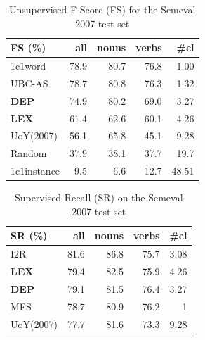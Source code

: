  

\begin{table}[!htb]
\centering

\begin{tabular}{@{}lrrrr@{}}
\toprule
\textbf{FS (\%)} & \textbf{all} & \textbf{nouns} & \textbf{verbs} & \textbf{\#cl} \\ \midrule
1c1word          & 78.9         & 80.7           & 76.8           & 1.00             \\
UBC-AS           & 78.7         & 80.8           & 76.3           & 1.32          \\
\textbf{DEP}     & 74.9         & 80.2           & 69.0           & 3.27          \\
\textbf{LEX}     & 61.4         & 62.6           & 60.1           & 4.26         \\
UoY(2007)        & 56.1         & 65.8           & 45.1           & 9.28          \\
Random           & 37.9         & 38.1           & 37.7           & 19.7             \\
1c1instance & 	9.5         & 6.6           & 12.7           & 48.51             \\ \bottomrule
\end{tabular}
\caption{Unsupervised F-Score (FS) for the Semeval 2007 test set}
\label{tab:sem2007_unsup_FS}
\end{table}
 

\begin{table}[!htb]
\centering

\begin{tabular}{@{}lrrrr@{}}
\toprule
\textbf{SR (\%)} & \textbf{all} & \textbf{nouns} & \textbf{verbs} & \textbf{\#cl} \\ \midrule
I2R & 81.6 & 86.8 & 75.7 & 3.08 \\
\textbf{LEX} & 79.4 & 82.5 & 75.9 & 4.26 \\
\textbf{DEP} & 79.1 & 81.5 & 76.4 & 3.27\\
MFS & 78.7 & 80.9 & 76.2 & 1 \\
UoY(2007) & 77.7 & 81.6 & 73.3 & 9.28 \\ \bottomrule
\end{tabular}
\caption{Supervised Recall (SR) on the Semeval 2007 test set}
\label{tab:sem2007_sup_recall}
\end{table}



